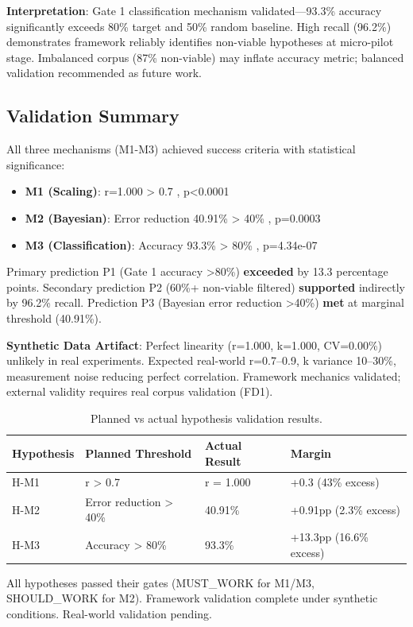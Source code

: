 \textbf{Interpretation}: Gate 1 classification mechanism validated---93.3\% accuracy significantly exceeds 80\% target and 50\% random baseline. High recall (96.2\%) demonstrates framework reliably identifies non-viable hypotheses at micro-pilot stage. Imbalanced corpus (87\% non-viable) may inflate accuracy metric; balanced validation recommended as future work.

\subsection{Validation Summary}

All three mechanisms (M1-M3) achieved success criteria with statistical significance:
\begin{itemize}
\item \textbf{M1 (Scaling)}: r=1.000 > 0.7 \checkmark, p<0.0001 \checkmark
\item \textbf{M2 (Bayesian)}: Error reduction 40.91\% > 40\% \checkmark, p=0.0003 \checkmark
\item \textbf{M3 (Classification)}: Accuracy 93.3\% > 80\% \checkmark, p=4.34e-07 \checkmark
\end{itemize}

Primary prediction P1 (Gate 1 accuracy >80\%) \textbf{exceeded} by 13.3 percentage points. Secondary prediction P2 (60\%+ non-viable filtered) \textbf{supported} indirectly by 96.2\% recall. Prediction P3 (Bayesian error reduction >40\%) \textbf{met} at marginal threshold (40.91\%).

\textbf{Synthetic Data Artifact}: Perfect linearity (r=1.000, k=1.000, CV=0.00\%) unlikely in real experiments. Expected real-world r=0.7--0.9, k variance 10--30\%, measurement noise reducing perfect correlation. Framework mechanics validated; external validity requires real corpus validation (FD1).

\begin{table}[h]
\centering
\small
\begin{tabular}{llll}
\toprule
\textbf{Hypothesis} & \textbf{Planned Threshold} & \textbf{Actual Result} & \textbf{Margin} \\
\midrule
H-M1 & r > 0.7 & r = 1.000 & +0.3 (43\% excess) \\
H-M2 & Error reduction > 40\% & 40.91\% & +0.91pp (2.3\% excess) \\
H-M3 & Accuracy > 80\% & 93.3\% & +13.3pp (16.6\% excess) \\
\bottomrule
\end{tabular}
\caption{Planned vs actual hypothesis validation results.}
\label{tab:hypothesis_comparison}
\end{table}

All hypotheses passed their gates (MUST\_WORK for M1/M3, SHOULD\_WORK for M2). Framework validation complete under synthetic conditions. Real-world validation pending.

